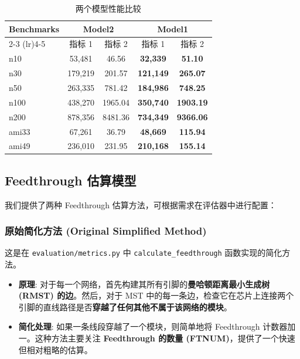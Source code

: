 \documentclass[conference]{IEEEtran}
\begin{document}
\begin{table}[htbp] %
    \centering %
    \caption{两个模型性能比较} %
    \label{tab:two_models_comparison} %
    \small %
    \setlength{\tabcolsep}{6pt} %

    \begin{tabular}{l|cc|cc}
        \toprule
        Benchmarks & \multicolumn{2}{c|}{Model2} & \multicolumn{2}{c}{Model1} \\ %
        \cmidrule(lr){2-3} \cmidrule(lr){4-5} %
        & 指标 1 & 指标 2 & 指标 1 & 指标 2 \\ %
        \midrule
        n10  & 53,481  & 46.56  & \textbf{32,339} & \textbf{51.10} \\ %
        n30  & 179,219 & 201.57  & \textbf{121,149} & \textbf{265.07} \\ %
        n50  & 263,335 & 781.42  & \textbf{184,986} & \textbf{748.25} \\ %
        n100 & 438,270 & 1965.04  & \textbf{350,740} & \textbf{1903.19} \\ %
        n200 & 878,356 & 8481.36 & \textbf{734,349} & \textbf{9366.06} \\ %
        ami33& 67,261  & 36.79  & \textbf{48,669}  & \textbf{115.94} \\ %
        ami49& 236,010 & 231.95 & \textbf{210,168}& \textbf{155.14} \\ %
        \midrule
        \bottomrule
    \end{tabular}
\end{table}

\subsection{Feedthrough 估算模型}
我们提供了两种 Feedthrough 估算方法，可根据需求在评估器中进行配置：

\subsubsection{原始简化方法 (Original Simplified Method)}
这是在 \texttt{evaluation/metrics.py} 中 \texttt{calculate\_feedthrough} 函数实现的简化方法。
\begin{itemize}
    \item \textbf{原理}: 对于每一个网络，首先构建其所有引脚的\textbf{曼哈顿距离最小生成树 (RMST) 的边}。然后，对于 MST 中的每一条边，检查它在芯片上连接两个引脚的直线路径是否\textbf{穿越了任何其他不属于该网络的模块}。
    \item \textbf{简化处理}: 如果一条线段穿越了一个模块，则简单地将 Feedthrough 计数器加一。这种方法主要关注 \textbf{Feedthrough 的数量 (FTNUM)}，提供了一个快速但相对粗略的估算。
\end{itemize}
\end{document}
